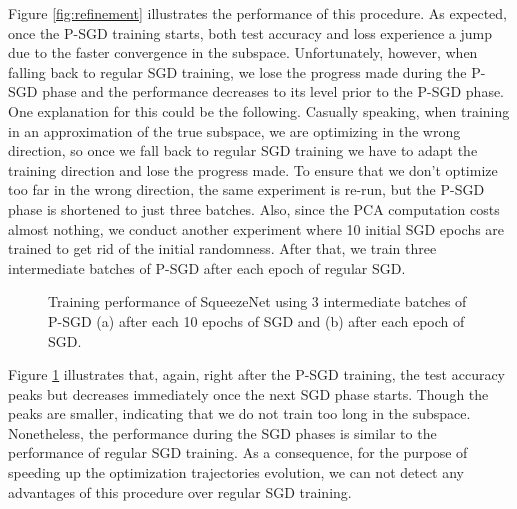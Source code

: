 \documentclass[11pt, a4paper]{article}
\begin{document}
Figure \ref{fig:refinement} illustrates the performance of this procedure. As expected, once the P-SGD training starts, both test accuracy and loss experience a jump due to the faster convergence in the subspace. Unfortunately, however, when falling back to regular SGD training, we lose the progress made during the P-SGD phase and the performance decreases to its level prior to the P-SGD phase. One explanation for this could be the following. Casually speaking, when training in an approximation of the true subspace, we are optimizing in the wrong direction, so once we fall back to regular SGD training we have to adapt the training direction and lose the progress made. To ensure that we don't optimize too far in the wrong direction, the same experiment is re-run, but the P-SGD phase is shortened to just three batches. Also, since the PCA computation costs almost nothing, we conduct another experiment where 10 initial SGD epochs are trained to get rid of the initial randomness. After that, we train three intermediate batches of P-SGD after each epoch of regular SGD.

\begin{figure}[!h]
\centering
{}
\parbox{14.5cm}{\centering \caption{\centering Training performance of SqueezeNet using 3 intermediate batches of P-SGD (a) after each 10 epochs of SGD and (b) after each epoch of SGD. \label{fig:refinement2}}}
\end{figure}

Figure \ref{fig:refinement2} illustrates that, again, right after the P-SGD training, the test accuracy peaks but decreases immediately once the next SGD phase starts. Though the peaks are smaller, indicating that we do not train too long in the subspace. Nonetheless, the performance during the SGD phases is similar to the performance of regular SGD training. As a consequence, for the purpose of speeding up the optimization trajectories evolution, we can not detect any advantages of this procedure over regular SGD training.
\end{document}
